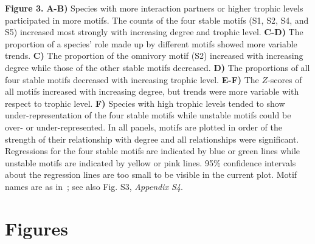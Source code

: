 \documentclass[12pt]{article}
\begin{document}
\begin{spacing}{2.0}
	\noindent\textbf{Figure 3.} \textbf{A-B)} Species with more interaction partners or higher trophic levels  participated in more motifs. The counts of the four stable motifs (S1, S2, S4, and S5) increased most strongly with increasing degree and trophic level. \textbf{C-D)} The proportion of a species' role made up by different motifs showed more variable trends.
		\textbf{C)} The proportion of the omnivory motif (S2) increased with increasing degree while those of the other stable motifs decreased. \textbf{D)} The proportions of all four stable motifs  decreased with increasing trophic level.
		\textbf{E-F)} The $Z$-scores of all motifs increased with increasing degree, but trends were more variable with respect to trophic level. \textbf{F)} Species with high trophic levels tended to show under-representation of the four stable motifs while unstable motifs could be over- or under-represented. In all panels, motifs are plotted in order of the strength of their relationship with degree and all relationships were significant. Regressions for the four stable motifs are indicated by blue or green lines while unstable motifs are indicated by yellow or pink lines. 95\% confidence intervals about the regression lines are too small to be visible in the current plot. Motif names are as in~\citet{Stouffer2007}; see also Fig. S3, \emph{Appendix S4}.
\end{spacing}

\clearpage

\section*{Figures}
\end{document}
